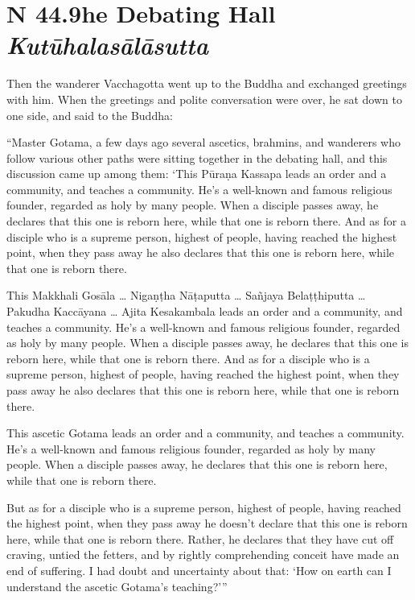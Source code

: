 \documentclass[12pt,openany]{book}%
\newcommand*{\suttatitleacronym}[1]{\smaller[2]{#1}\vspace*{.3em}}
\newcommand*{\suttatitletranslation}[1]{\linebreak{#1}}
\newcommand*{\suttatitleroot}[1]{\linebreak\smaller[2]\itshape{#1}}
\newcommand*{\tocacronym}[1]{\hspace*{-3.3em}{#1}\quad}
\newcommand*{\toctranslation}[1]{#1}
\newcommand*{\tocroot}[1]{(\textit{#1})}
\begin{document}
%
\section*{{\suttatitleacronym SN 44.9}{\suttatitletranslation The Debating Hall }{\suttatitleroot Kutūhalasālāsutta}}
\addcontentsline{toc}{section}{\tocacronym{SN 44.9} \toctranslation{The Debating Hall } \tocroot{Kutūhalasālāsutta}}

Then the wanderer Vacchagotta went up to the Buddha and exchanged greetings with him. When the greetings and polite conversation were over, he sat down to one side, and said to the Buddha: 

“Master Gotama, a few days ago several ascetics, brahmins, and wanderers who follow various other paths were sitting together in the debating hall, and this discussion came up among them: ‘This \textsanskrit{Pūraṇa} Kassapa leads an order and a community, and teaches a community. He’s a well-known and famous religious founder, regarded as holy by many people. When a disciple passes away, he declares that this one is reborn here, while that one is reborn there. And as for a disciple who is a supreme person, highest of people, having reached the highest point, when they pass away he also declares that this one is reborn here, while that one is reborn there. 

This Makkhali \textsanskrit{Gosāla} … \textsanskrit{Nigaṇṭha} \textsanskrit{Nāṭaputta} … \textsanskrit{Sañjaya} \textsanskrit{Belaṭṭhiputta} … Pakudha \textsanskrit{Kaccāyana} … Ajita Kesakambala leads an order and a community, and teaches a community. He’s a well-known and famous religious founder, regarded as holy by many people. When a disciple passes away, he declares that this one is reborn here, while that one is reborn there. And as for a disciple who is a supreme person, highest of people, having reached the highest point, when they pass away he also declares that this one is reborn here, while that one is reborn there. 

This ascetic Gotama leads an order and a community, and teaches a community. He’s a well-known and famous religious founder, regarded as holy by many people. When a disciple passes away, he declares that this one is reborn here, while that one is reborn there. 

But as for a disciple who is a supreme person, highest of people, having reached the highest point, when they pass away he doesn’t declare that this one is reborn here, while that one is reborn there. Rather, he declares that they have cut off craving, untied the fetters, and by rightly comprehending conceit have made an end of suffering. I had doubt and uncertainty about that: ‘How on earth can I understand the ascetic Gotama’s teaching?’” 
\end{document}
